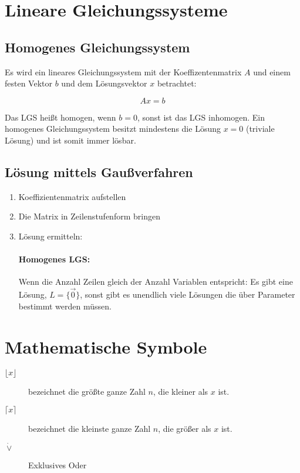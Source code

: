 \documentclass[10pt,a4paper,twoside,twocolumn]{article}
\begin{document}
	
	\section{Lineare Gleichungssysteme}
	
	\subsection{Homogenes Gleichungssystem}
	
	Es wird ein lineares Gleichungssystem mit der Koeffizentenmatrix $ A $ und einem festen Vektor $ b $ und dem Lösungsvektor $ x $ betrachtet:
	
	\[ Ax = b \]
	
	Das LGS heißt homogen, wenn $ b = 0 $, sonst ist das LGS inhomogen. Ein homogenes Gleichungssystem besitzt mindestens die Lösung $ x = 0 $ (triviale Lösung) und ist somit immer lösbar.
	
	\subsection{Lösung mittels Gaußverfahren}
	
	\begin{enumerate}
		\item Koeffizientenmatrix aufstellen
		\item Die Matrix in Zeilenstufenform bringen
		\item Lösung ermitteln:
		
		\paragraph{Homogenes LGS:} Wenn die Anzahl Zeilen gleich der Anzahl Variablen entspricht: Es gibt eine Lösung, $ L = \{ \vec{0} \} $, sonst gibt es unendlich viele Lösungen die über Parameter bestimmt werden müssen.
	\end{enumerate}
	
	\section{Mathematische Symbole}

	\begin{description}
		\item[$ \lfloor x \rfloor $] bezeichnet die größte ganze Zahl $ n $, die kleiner als $ x $ ist.
		\item[$ \lceil x \rceil $] bezeichnet die kleinste ganze Zahl $ n $, die größer als $ x $ ist.
		\item[$ \dot{\lor} $] Exklusives Oder
	\end{description}
\end{document}
